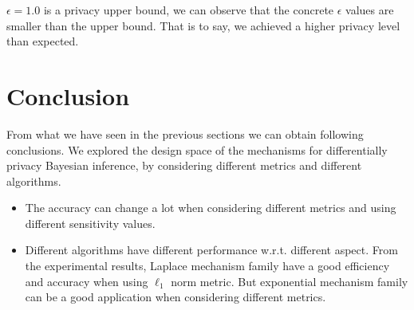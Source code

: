 \documentclass{article}
\begin{document}
$\epsilon = 1.0$ is a privacy upper bound, we can observe that the concrete $\epsilon$ values are smaller than the upper bound. That is to say, we achieved a higher privacy level than expected. 


\section{Conclusion}
From what we have seen in the previous sections we can obtain following conclusions. We explored the design space of the mechanisms for differentially privacy Bayesian inference, by considering different metrics and different algorithms.
\begin{itemize}
  \item The accuracy can change a lot when considering different metrics and using different sensitivity values.
  \item Different algorithms have different performance w.r.t. different aspect. From the experimental results, Laplace mechanism family have a good efficiency and accuracy when using $\ell_1$ norm metric. But exponential mechanism family can be a good application when considering different metrics.
\end{itemize}









\end{document}
